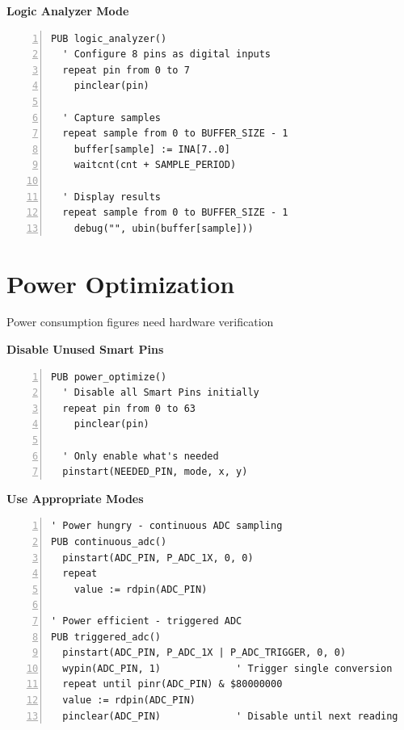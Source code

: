 \documentclass[11pt,a4paper,oneside,english]{book}
\begin{document}
\textbf{Logic Analyzer Mode}

\begin{Spin2Block}
\begin{Verbatim}[numbers=left,numbersep=5pt,xleftmargin=15pt]
PUB logic_analyzer()
  ' Configure 8 pins as digital inputs
  repeat pin from 0 to 7
    pinclear(pin)
    
  ' Capture samples
  repeat sample from 0 to BUFFER_SIZE - 1
    buffer[sample] := INA[7..0]
    waitcnt(cnt + SAMPLE_PERIOD)
    
  ' Display results
  repeat sample from 0 to BUFFER_SIZE - 1
    debug("", ubin(buffer[sample]))
\end{Verbatim}
\end{Spin2Block}

\hypertarget{power-optimization}{%
\section{Power Optimization}\label{power-optimization}}

Power consumption figures need hardware verification

\textbf{Disable Unused Smart Pins}

\begin{Spin2Block}
\begin{Verbatim}[numbers=left,numbersep=5pt,xleftmargin=15pt]
PUB power_optimize()
  ' Disable all Smart Pins initially
  repeat pin from 0 to 63
    pinclear(pin)
    
  ' Only enable what's needed
  pinstart(NEEDED_PIN, mode, x, y)
\end{Verbatim}
\end{Spin2Block}

\textbf{Use Appropriate Modes}

\begin{Spin2Block}
\begin{Verbatim}[numbers=left,numbersep=5pt,xleftmargin=15pt]
' Power hungry - continuous ADC sampling
PUB continuous_adc()
  pinstart(ADC_PIN, P_ADC_1X, 0, 0)
  repeat
    value := rdpin(ADC_PIN)
    
' Power efficient - triggered ADC
PUB triggered_adc()
  pinstart(ADC_PIN, P_ADC_1X | P_ADC_TRIGGER, 0, 0)
  wypin(ADC_PIN, 1)             ' Trigger single conversion
  repeat until pinr(ADC_PIN) & $80000000
  value := rdpin(ADC_PIN)
  pinclear(ADC_PIN)             ' Disable until next reading
\end{Verbatim}
\end{Spin2Block}
\end{document}
